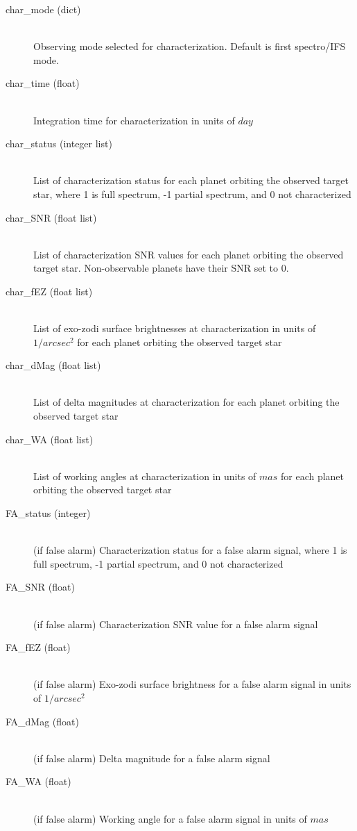 \documentclass[cleanfoot]{asme2ej}
\begin{document}
\begin{itemize}
\begin{description}
\begin{description}
        \item[char\_mode (dict)] \hfill \\ Observing mode selected for characterization. Default is first spectro/IFS mode.
        \item[char\_time (float)] \hfill \\ Integration time for characterization in units of $ day $
        \item[char\_status (integer list)] \hfill \\ List of characterization status for each planet orbiting the observed target star, where 1 is full spectrum, -1 partial spectrum, and 0 not characterized
        \item[char\_SNR (float list)] \hfill \\ List of characterization SNR values for each planet orbiting the observed target star. Non-observable planets have their SNR set to 0.
        \item[char\_fEZ (float list)] \hfill \\ List of exo-zodi surface brightnesses at characterization in units of $1/arcsec^2$ for each planet orbiting the observed target star
        \item[char\_dMag (float list)] \hfill \\ List of delta magnitudes at characterization for each planet orbiting the observed target star
        \item[char\_WA (float list)] \hfill \\ List of working angles at characterization in units of $mas$ for each planet orbiting the observed target star
        \item[FA\_status (integer)] \hfill \\ (if false alarm) Characterization status for a false alarm signal, where 1 is full spectrum, -1 partial spectrum, and 0 not characterized
        \item[FA\_SNR (float)] \hfill \\ (if false alarm) Characterization SNR value for a false alarm signal
        \item[FA\_fEZ (float)] \hfill \\ (if false alarm) Exo-zodi surface brightness for a false alarm signal in units of $1/arcsec^2$
        \item[FA\_dMag (float)] \hfill \\ (if false alarm) Delta magnitude for a false alarm signal
        \item[FA\_WA (float)] \hfill \\ (if false alarm) Working angle for a false alarm signal in units of $mas$

\end{description}
\end{description}
\end{itemize}
\end{document}
